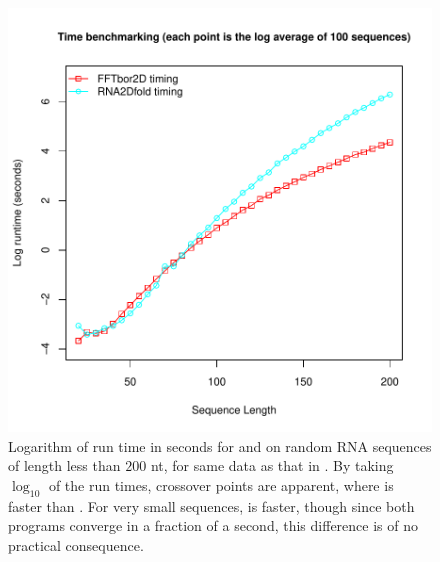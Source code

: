\begin{figure}[!ht]
\centering
\includegraphics[width=.9\textwidth]{Figures/FFTbor2D/ffttwoRtwofoldLogScale.pdf}
\caption[Logarithm of run time in seconds for \rnatwofold and \ffttwo
on random RNA sequences of length less than $200$ nt]{
Logarithm of run time in seconds for \rnatwofold and \ffttwo
on random RNA sequences of length less than $200$ nt, for same data as that
in .
By taking $\log_{10}$ of the run times,
crossover points are apparent,
where \ffttwo is faster than \rnatwofold. For very small
sequences, \rnatwofold is faster, though since both programs converge
in a fraction of a second, this difference is of no practical consequence.
}
\label{fig:ffttwo:ffttwoRtwofoldLogScale}
\end{figure}


